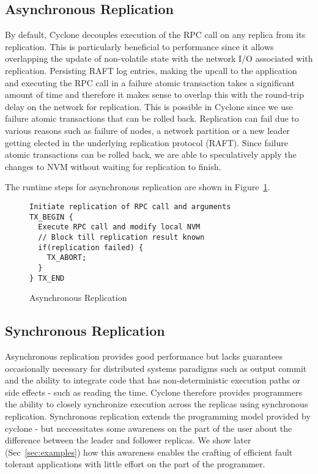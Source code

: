 \documentclass[twocolumn]{article}
\begin{document}
\subsection{Asynchronous Replication}
By default, Cyclone decouples execution of the RPC call on any replica from its
replication. This is particularly beneficial to performance since it allows
overlapping the update of non-volatile state with the network I/O associated
with replication. Persisting RAFT log entries, making the upcall to the
application and executing the RPC call in a failure atomic transaction takes a
significant amount of time and therefore it makes sense to overlap this with the
round-trip delay on the network for replication. This is possible in Cyclone
since we use failure atomic transactions that can be rolled back. Replication
can fail due to various reasons such as failure of nodes, a network partition or
a new leader getting elected in the underlying replication protocol
(RAFT). Since failure atomic transactions can be rolled back, we are able to
speculatively apply the changes to NVM without waiting for replication to
finish.

The runtime steps for asynchronous replication are shown in
Figure~\ref{fig:async_rep}.

\begin{figure}
{ \scriptsize
\begin{verbatim}
Initiate replication of RPC call and arguments
TX_BEGIN {
  Execute RPC call and modify local NVM
  // Block till replication result known
  if(replication failed) {
    TX_ABORT;
  }
} TX_END
\end{verbatim}
}
\caption{Asynchronous Replication}
\label{fig:async_rep}
\end{figure}

\subsection{Synchronous Replication}
\label{sec:synch}
Asynchronous replication provides good performance but lacks guarantees
occasionally necessary for distributed systems paradigms such as output commit and
the ability to integrate code that has non-deterministic execution paths or side
effects - such as reading the time. Cyclone therefore provides programmers the
ability to closely synchronize execution across the replicas using synchronous
replication. Synchronous replication extends the programming model provided by
cyclone - but neccessitates some awareness on the part of the user about
the difference between the leader and follower replicas. We show later
(Sec~\ref{sec:examples}) how this awareness enables the crafting of efficient
fault tolerant applications with little effort on the part of the programmer.
\end{document}

